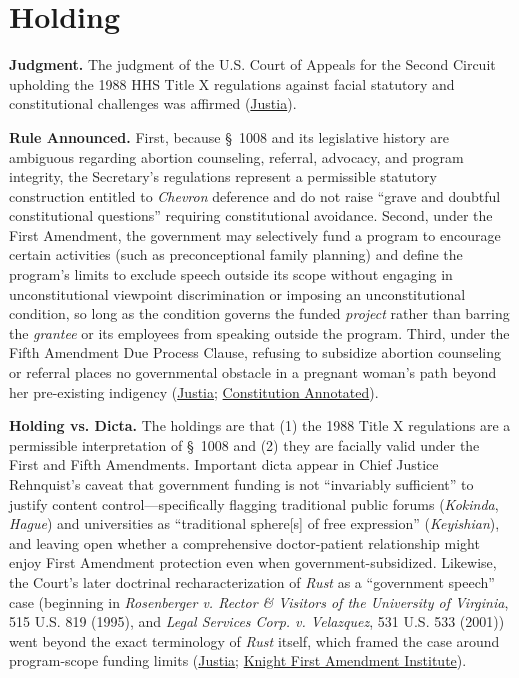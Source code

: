 \documentclass[12pt]{article}
\begin{document}
\section{Holding}

\textbf{Judgment.} The judgment of the U.S. Court of Appeals for the Second Circuit upholding the 1988 HHS Title X regulations against facial statutory and constitutional challenges was affirmed (\href{https://supreme.justia.com/cases/federal/us/500/173/}{Justia}).

\textbf{Rule Announced.} First, because \S~1008 and its legislative history are ambiguous regarding abortion counseling, referral, advocacy, and program integrity, the Secretary's regulations represent a permissible statutory construction entitled to \textit{Chevron} deference and do not raise ``grave and doubtful constitutional questions'' requiring constitutional avoidance. Second, under the First Amendment, the government may selectively fund a program to encourage certain activities (such as preconceptional family planning) and define the program's limits to exclude speech outside its scope without engaging in unconstitutional viewpoint discrimination or imposing an unconstitutional condition, so long as the condition governs the funded \textit{project} rather than barring the \textit{grantee} or its employees from speaking outside the program. Third, under the Fifth Amendment Due Process Clause, refusing to subsidize abortion counseling or referral places no governmental obstacle in a pregnant woman's path beyond her pre-existing indigency (\href{https://supreme.justia.com/cases/federal/us/500/173/}{Justia}; \href{https://www.law.cornell.edu/constitution-conan/amendment-1/selective-funding-arrangements}{Constitution Annotated}).

\textbf{Holding vs. Dicta.} The holdings are that (1) the 1988 Title X regulations are a permissible interpretation of \S~1008 and (2) they are facially valid under the First and Fifth Amendments. Important dicta appear in Chief Justice Rehnquist's caveat that government funding is not ``invariably sufficient'' to justify content control---specifically flagging traditional public forums (\textit{Kokinda}, \textit{Hague}) and universities as ``traditional sphere[s] of free expression'' (\textit{Keyishian}), and leaving open whether a comprehensive doctor-patient relationship might enjoy First Amendment protection even when government-subsidized. Likewise, the Court's later doctrinal recharacterization of \textit{Rust} as a ``government speech'' case (beginning in \textit{Rosenberger v. Rector \& Visitors of the University of Virginia}, 515 U.S. 819 (1995), and \textit{Legal Services Corp. v. Velazquez}, 531 U.S. 533 (2001)) went beyond the exact terminology of \textit{Rust} itself, which framed the case around program-scope funding limits (\href{https://supreme.justia.com/cases/federal/us/500/173/}{Justia}; \href{https://knightcolumbia.org/content/the-government-speech-doctrine-goes-to-school}{Knight First Amendment Institute}).
\end{document}

